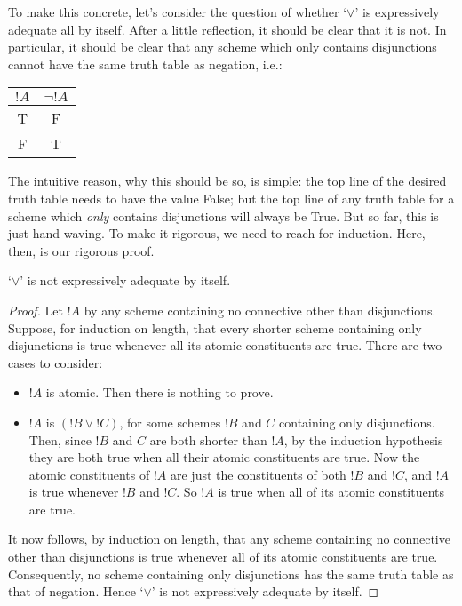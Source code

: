 \documentclass[../../../include/open-logic-section]{subfiles}
\begin{document}
 To make this concrete, let's consider the question of whether `$\lor$' is expressively adequate all by itself. After a little reflection, it should be clear that it is not. In particular, it should be clear that any scheme which only contains disjunctions cannot have the same truth table as negation, i.e.:
				\begin{center}
				\begin{tabular}{c | c}
				${!A}$ & $\lnot {!A}$\\
				\hline
				 T &  F \\
				 F & T
				\end{tabular}
				\end{center}
The intuitive reason, why this should be so, is simple: the top line of the desired truth table needs to have the value False; but the top line of any truth table for a scheme which \emph{only} contains disjunctions will always be True. But so far, this is just hand-waving. To make it rigorous, we need to reach for induction. Here, then, is our rigorous proof.
 	\begin{prop}
		`$\lor$' is not expressively adequate by itself.
		\begin{proof}
			Let ${!A}$ by any scheme containing no connective other than disjunctions. Suppose, for induction on length, that every shorter scheme containing only disjunctions is true whenever all its atomic constituents are true. There are two cases to consider:
				\begin{itemize}
					\item ${!A}$ is atomic. Then there is nothing to prove.
					\item ${!A}$ is $({!B} \lor {!C})$, for some schemes ${!B}$ and ${C}$ containing only disjunctions. Then, since ${!B}$ and ${C}$ are both shorter than ${!A}$, by the induction hypothesis they are both true when all their atomic constituents are true. Now the atomic constituents of ${!A}$ are just the constituents of both ${!B}$ and ${!C}$, and ${!A}$ is true whenever ${!B}$ and ${!C}$. So ${!A}$ is true when all of its atomic constituents are true.
				\end{itemize}
			It now follows, by induction on length, that any scheme containing no connective other than disjunctions is true whenever all of its atomic constituents are true. Consequently, no scheme containing only disjunctions has the same truth table as that of negation. Hence `$\lor$' is not expressively adequate by itself.
		\end{proof}
	\end{prop}\noindent
\end{document}
